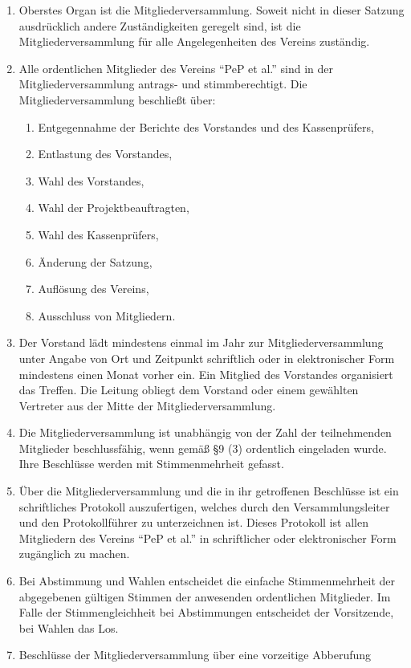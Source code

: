 \documentclass[
  fontsize=12pt,
  paper=a4,
  DIV14,
  parskip,
]{scrartcl}
\begin{document}
\begin{enumerate}
	\item Oberstes Organ ist die Mitgliederversammlung. Soweit nicht in dieser
		Satzung ausdrücklich andere Zuständigkeiten geregelt sind, ist die
		Mitgliederversammlung für alle Angelegenheiten des Vereins zuständig.
	\item Alle ordentlichen Mitglieder des Vereins \enquote{PeP et al.} sind
		in der Mitgliederversammlung antrags- und stimmberechtigt. Die
		Mitgliederversammlung beschließt über:
	\begin{enumerate}
		\item Entgegennahme der Berichte des Vorstandes und des Kassenprüfers,
		\item Entlastung des Vorstandes,
		\item Wahl des Vorstandes,
		\item Wahl der Projektbeauftragten,
		\item Wahl des Kassenprüfers,
		\item Änderung der Satzung,
		\item Auflösung des Vereins,
		\item Ausschluss von Mitgliedern.
	\end{enumerate}
	\item Der Vorstand lädt mindestens einmal im Jahr zur Mitgliederversammlung
		unter Angabe von Ort und Zeitpunkt schriftlich oder in elektronischer Form
		mindestens einen Monat vorher ein. Ein Mitglied des Vorstandes organisiert
		das Treffen. Die Leitung obliegt dem Vorstand oder einem gewählten
		Vertreter aus der Mitte der Mitgliederversammlung.
	\item Die Mitgliederversammlung ist unabhängig von der Zahl der teilnehmenden
		Mitglieder beschlussfähig, wenn gemäß §9 (3) ordentlich eingeladen wurde.
		Ihre Beschlüsse werden mit Stimmenmehrheit gefasst.
	\item Über die Mitgliederversammlung und die in ihr getroffenen Beschlüsse
		ist ein schriftliches Protokoll auszufertigen, welches durch den
		Versammlungsleiter und den Protokollführer zu unterzeichnen ist. Dieses
		Protokoll ist allen Mitgliedern des Vereins \enquote{PeP et al.} in
		schriftlicher oder elektronischer Form zugänglich zu machen.
	\item Bei Abstimmung und Wahlen entscheidet die einfache Stimmenmehrheit
		der abgegebenen gültigen Stimmen der anwesenden ordentlichen Mitglieder.
		Im Falle der Stimmengleichheit bei Abstimmungen entscheidet der Vorsitzende,
		bei Wahlen das Los.
	\item Beschlüsse der Mitgliederversammlung über eine vorzeitige Abberufung

\end{enumerate}
\end{document}

